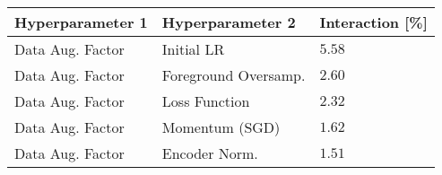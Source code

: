 \begin{tabular}{lll}
\toprule
Hyperparameter 1 & Hyperparameter 2 & Interaction [\%] \\
\midrule
Data Aug. Factor & Initial LR & $5.58$ \\
Data Aug. Factor & Foreground Oversamp. & $2.60$ \\
Data Aug. Factor & Loss Function & $2.32$ \\
Data Aug. Factor & Momentum (SGD) & $1.62$ \\
Data Aug. Factor & Encoder Norm. & $1.51$ \\
\bottomrule
\end{tabular}
